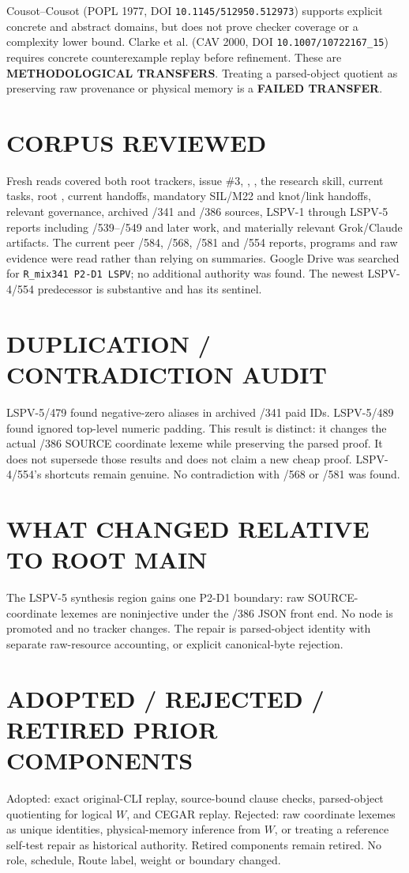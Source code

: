 \documentclass[11pt]{article}
\begin{document}
Cousot--Cousot (POPL 1977, DOI
\texttt{10.1145/512950.512973}) supports explicit concrete and abstract
domains, but does not prove checker coverage or a complexity lower bound.
Clarke et al. (CAV 2000, DOI
\texttt{10.1007/10722167\_15}) requires concrete counterexample replay
before refinement.  These are \textbf{METHODOLOGICAL TRANSFERS}.  Treating a
parsed-object quotient as preserving raw provenance or physical memory is a
\textbf{FAILED TRANSFER}.

\section{CORPUS REVIEWED}
Fresh reads covered both root trackers, issue \#3, ,
, the research skill, current tasks, root ,
current handoffs, mandatory SIL/M22 and knot/link handoffs, relevant
governance, archived /341 and /386 sources, LSPV-1 through LSPV-5 reports
including /539--/549 and later work, and materially relevant Grok/Claude
artifacts.  The current peer /584, /568, /581 and /554 reports, programs and
raw evidence were read rather than relying on summaries.  Google Drive was
searched for \texttt{R\_mix341 P2-D1 LSPV}; no additional authority was
found.  The newest LSPV-4/554 predecessor is substantive and has its sentinel.

\section{DUPLICATION / CONTRADICTION AUDIT}
LSPV-5/479 found negative-zero aliases in archived /341 paid IDs.  LSPV-5/489
found ignored top-level numeric padding.  This result is distinct: it changes
the actual /386 SOURCE coordinate lexeme while preserving the parsed proof.
It does not supersede those results and does not claim a new cheap proof.
LSPV-4/554's shortcuts remain genuine.  No contradiction with /568 or /581
was found.

\section{WHAT CHANGED RELATIVE TO ROOT MAIN}
The LSPV-5 synthesis region gains one P2-D1 boundary: raw SOURCE-coordinate
lexemes are noninjective under the /386 JSON front end.  No node is promoted
and no tracker changes.  The repair is parsed-object identity with separate
raw-resource accounting, or explicit canonical-byte rejection.

\section{ADOPTED / REJECTED / RETIRED PRIOR COMPONENTS}
Adopted: exact original-CLI replay, source-bound clause checks, parsed-object
quotienting for logical $W$, and CEGAR replay.  Rejected: raw coordinate
lexemes as unique identities, physical-memory inference from $W$, or treating
a reference self-test repair as historical authority.  Retired components
remain retired.  No role, schedule, Route label, weight or boundary changed.
\end{document}

